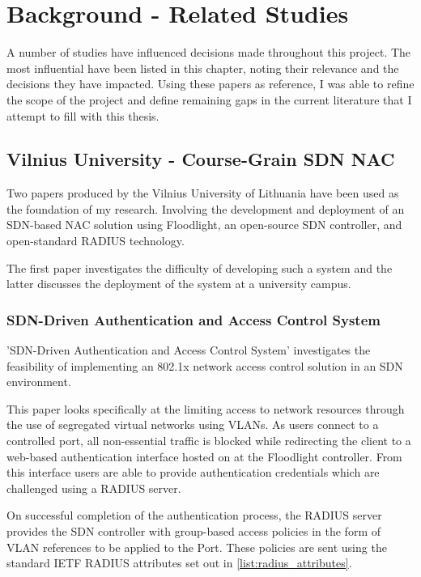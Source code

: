\chapter{Background - Related Studies}
A number of studies have influenced decisions made throughout this project. The most influential have been listed in this chapter, noting their relevance and the decisions they have impacted.
Using these papers as reference, I was able to refine the scope of the project and define remaining gaps in the current literature that I attempt to fill with this thesis.

\section{Vilnius University - Course-Grain SDN NAC}
Two papers produced by the Vilnius University of Lithuania have been used as the foundation of my research. Involving the development and deployment of an SDN-based NAC solution using Floodlight, an open-source SDN controller, and open-standard RADIUS technology.

The first paper investigates the difficulty of developing such a system and the latter discusses the deployment of the system at a university campus.

\subsection{SDN-Driven Authentication and Access Control System}\label{chap:vilnius}
'SDN-Driven Authentication and Access Control System'\cite{vainius_sdn_nac} investigates the feasibility of implementing an 802.1x network access control solution in an SDN environment. 

This paper looks specifically at the limiting access to network resources through the use of segregated virtual networks using VLANs. As users connect to a controlled port, all non-essential traffic is blocked while redirecting the client to a web-based authentication interface hosted on at the Floodlight controller. From this interface users are able to provide authentication credentials which are challenged using a RADIUS server. 

On successful completion of the authentication process, the RADIUS server provides the SDN controller with group-based access policies in the form of VLAN references to be applied to the Port. These policies are sent using the standard IETF RADIUS attributes set out in \ref{list:radius_attributes}.

